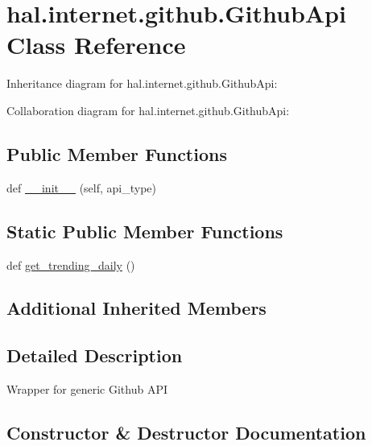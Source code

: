 \hypertarget{classhal_1_1internet_1_1github_1_1_github_api}{}\section{hal.\+internet.\+github.\+Github\+Api Class Reference}
\label{classhal_1_1internet_1_1github_1_1_github_api}


Inheritance diagram for hal.\+internet.\+github.\+Github\+Api\+:


Collaboration diagram for hal.\+internet.\+github.\+Github\+Api\+:
\subsection*{Public Member Functions}
\begin{DoxyCompactItemize}
\item 
def \hyperlink{classhal_1_1internet_1_1github_1_1_github_api_ad2f707e9a64cf97c85867af8aa4a8a2e}{\+\_\+\+\_\+init\+\_\+\+\_\+} (self, api\+\_\+type)
\end{DoxyCompactItemize}
\subsection*{Static Public Member Functions}
\begin{DoxyCompactItemize}
\item 
def \hyperlink{classhal_1_1internet_1_1github_1_1_github_api_ae2304c3d7d4a319174395e819163013b}{get\+\_\+trending\+\_\+daily} ()
\end{DoxyCompactItemize}
\subsection*{Additional Inherited Members}


\subsection{Detailed Description}
\begin{DoxyVerb}Wrapper for generic Github API \end{DoxyVerb}
 

\subsection{Constructor \& Destructor Documentation}
